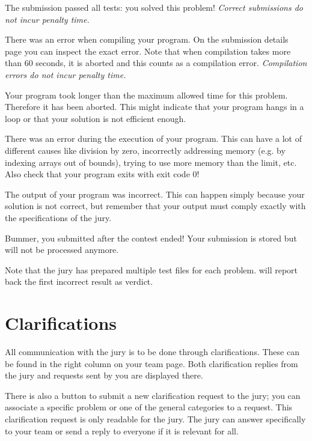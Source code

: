 \begin{description}[\setleftmargin{4.5cm}]
\item[CORRECT]
The submission passed all tests: you solved this problem!
\textit{Correct submissions do not incur penalty time.}

\item[COMPILER-ERROR]
There was an error when compiling your program. On the submission
details page you can inspect the exact error. Note that when
compilation takes more than 60 seconds, it is aborted and
this counts as a compilation error.
\textit{Compilation errors do not incur penalty time.}

\item[TIMELIMIT]
Your program took longer than the maximum allowed time for this
problem. Therefore it has been aborted. This might indicate that your
program hangs in a loop or that your solution is not efficient
enough.

\item[RUN-ERROR]
There was an error during the execution of your program. This can have
a lot of different causes like division by zero, incorrectly
addressing memory (e.g. by indexing arrays out of bounds), trying to
use more memory than the limit, etc.
Also check that your program exits with exit code 0!

\item[WRONG-ANSWER]
The output of your program was incorrect. This can happen simply
because your solution is not correct, but remember that your output
must comply exactly with the specifications of the jury.

\item[TOO-LATE]
Bummer, you submitted after the contest ended! Your submission is
stored but will not be processed anymore.
\end{description}

Note that the jury has prepared multiple test files for each problem. \DOMjudge
will report back the first incorrect result as verdict.

\section{Clarifications}

All communication with the jury is to be done through clarifications.
These can be found in the right column on your team page. Both
clarification replies from the jury and requests sent by you
are displayed there.

There is also a button to submit a new clarification request to the
jury; you can associate a specific problem or one of the general
categories to a request. This clarification request is only readable
for the jury. The jury can answer specifically to your team or send a
reply to everyone if it is relevant for all.

